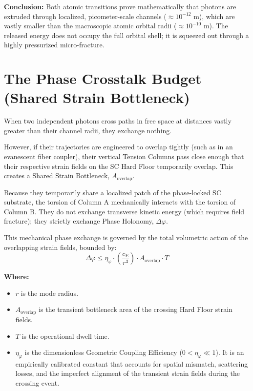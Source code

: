 \noindent\textbf{Conclusion:} Both atomic transitions prove mathematically that photons are extruded through localized, picometer-scale channels ($\approx 10^{-12}$ m), which are vastly smaller than the macroscopic atomic orbital radii ($\approx 10^{-10}$ m). The released energy does not occupy the full orbital shell; it is squeezed out through a highly pressurized micro-fracture.

\section{The Phase Crosstalk Budget (Shared Strain Bottleneck)}
When two independent photons cross paths in free space at distances vastly greater than their channel radii, they exchange nothing.

However, if their trajectories are engineered to overlap tightly (such as in an evanescent fiber coupler), their vertical Tension Columns pass close enough that their respective strain fields on the SC Hard Floor temporarily overlap. This creates a Shared Strain Bottleneck, $A_{\mathrm{overlap}}$.

Because they temporarily share a localized patch of the phase-locked SC substrate, the torsion of Column A mechanically interacts with the torsion of Column B. They do not exchange transverse kinetic energy (which requires field fracture); they strictly exchange Phase Holonomy, $\Delta\varphi$.

This mechanical phase exchange is governed by the total volumetric action of the overlapping strain fields, bounded by:
\begin{equation}
    \Delta\varphi \leq \eta_{\varphi} \cdot \left(\frac{c_{\mathrm{E}}}{r^3}\right) \cdot A_{\mathrm{overlap}} \cdot T
\end{equation}

\noindent\textbf{Where:}
\begin{itemize}
    \item $r$ is the mode radius.
    \item $A_{\mathrm{overlap}}$ is the transient bottleneck area of the crossing Hard Floor strain fields.
    \item $T$ is the operational dwell time.
    \item $\eta_{\varphi}$ is the dimensionless Geometric Coupling Efficiency ($0 < \eta_{\varphi} \ll 1$). It is an empirically calibrated constant that accounts for spatial mismatch, scattering losses, and the imperfect alignment of the transient strain fields during the crossing event.
\end{itemize}

